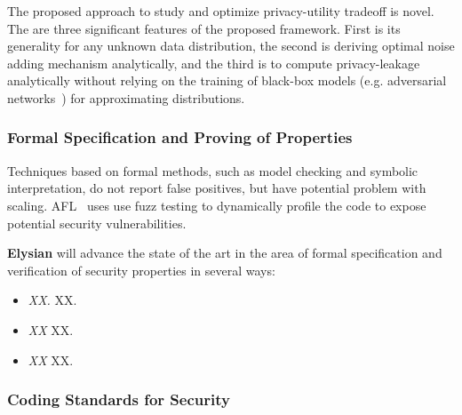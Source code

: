 \documentclass[a4paper,11pt]{article}
\newcommand{\project}[1]{\textbf{#1}\xspace}
\newcommand{\SECURITY}{\project{Elysian}}
\newcommand{\TheProject}{\SECURITY}
\begin{document}
The proposed approach to study and optimize privacy-utility tradeoff is novel. The are three significant features of the proposed framework. First is its generality for any unknown data distribution, the second is deriving optimal noise adding mechanism analytically, and the third is to compute privacy-leakage analytically without relying on the training of black-box models (e.g. adversarial networks~\cite{8919758}) for approximating distributions. 




\subsubsection{Formal Specification and Proving of Properties}
\label{sect:formal}


Techniques based on formal methods, such as model checking and symbolic interpretation, do not report false  positives, but have potential problem with scaling. AFL~\cite{AFL} uses use fuzz testing to dynamically profile the code to expose potential security vulnerabilities.

\begin{mdframed}[backgroundcolor=gray!10]
\TheProject{} will advance the state of the art in the area of formal specification and verification of security properties in several ways:
\begin{itemize}
\item \emph{XX.} XX.
\item \emph{XX} XX.
\item \emph{XX} XX.
\end{itemize}
\end{mdframed}

\subsubsection{Coding Standards for Security}
\label{sect:codingStandards}
\end{document}
